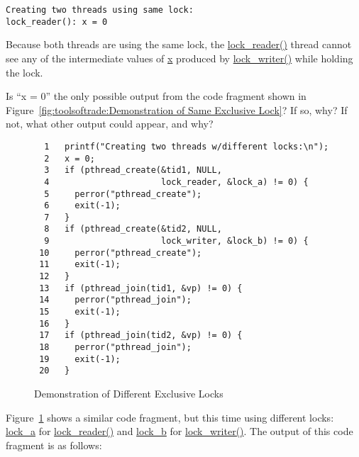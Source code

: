 \vspace{5pt}
\begin{minipage}[t]{\columnwidth}
\begin{verbatim}
Creating two threads using same lock:
lock_reader(): x = 0
\end{verbatim}
\end{minipage}
\vspace{5pt}

Because both threads are using the same lock, the \url{lock_reader()}
thread cannot see any of the intermediate values of \url{x} produced
by \url{lock_writer()} while holding the lock.

\QuickQuiz{}
	Is ``x = 0'' the only possible output from the code fragment
	shown in
	Figure~\ref{fig:toolsoftrade:Demonstration of Same Exclusive Lock}?
	If so, why?
	If not, what other output could appear, and why?
 \QuickQuizEnd

\begin{figure}[tbp]
{ \scriptsize
\begin{verbatim}
  1   printf("Creating two threads w/different locks:\n");
  2   x = 0;
  3   if (pthread_create(&tid1, NULL,
  4                      lock_reader, &lock_a) != 0) {
  5     perror("pthread_create");
  6     exit(-1);
  7   }
  8   if (pthread_create(&tid2, NULL,
  9                      lock_writer, &lock_b) != 0) {
 10     perror("pthread_create");
 11     exit(-1);
 12   }
 13   if (pthread_join(tid1, &vp) != 0) {
 14     perror("pthread_join");
 15     exit(-1);
 16   }
 17   if (pthread_join(tid2, &vp) != 0) {
 18     perror("pthread_join");
 19     exit(-1);
 20   }
\end{verbatim}
}
\caption{Demonstration of Different Exclusive Locks}
\label{fig:toolsoftrade:Demonstration of Different Exclusive Locks}
\end{figure}

Figure~\ref{fig:toolsoftrade:Demonstration of Different Exclusive Locks}
shows a similar code fragment, but this time using different locks:
\url{lock_a} for \url{lock_reader()} and \url{lock_b} for
\url{lock_writer()}.
The output of this code fragment is as follows:

